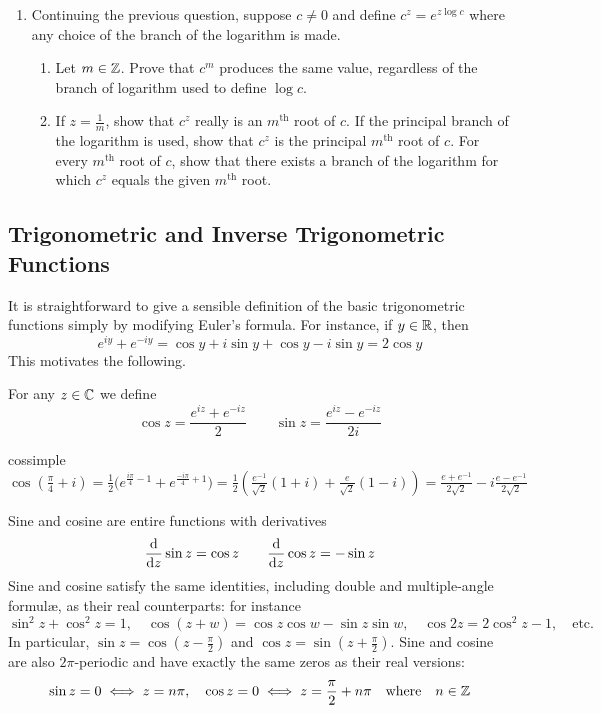 \begin{exercises*}
\begin{enumerate}
  \item Continuing the previous question, suppose $c\neq 0$ and define $c^z=e^{z\log c}$ where any choice of the branch of the logarithm is made.
  \begin{enumerate}
    \item Let $m\in\mathbb{Z}$. Prove that $c^m$ produces the same value, regardless of the branch of logarithm used to define $\log c$.
    \item If $z=\frac 1m$, show that $c^z$ really is an $m^\text{th}$ root of $c$. If the principal branch of the logarithm is used, show that $c^z$ is the principal $m^\text{th}$ root of $c$. For every $m^\text{th}$ root of $c$, show that there exists a branch of the logarithm for which $c^z$ equals the given $m^\text{th}$ root.
  \end{enumerate}
   
\end{enumerate}
\end{exercises*}
\clearpage

\subsection[Trigonometric Functions]{Trigonometric and Inverse Trigonometric Functions}%

It is straightforward to give a sensible definition of the basic trigonometric functions simply by modifying Euler's formula. For instance, if $y\in\mathbb{R}$, then
\[e^{iy}+e^{-iy}=\cos y+i\sin y+\cos y-i\sin y=2\cos y\]
This motivates the following.

\begin{defn}{}{}
For any $z\in\mathbb{C}$ we define
\[\cos z=\frac{e^{iz}+e^{-iz}}2\qquad \sin z=\frac{e^{iz}-e^{-iz}}{2i}\]
\end{defn}

\begin{example}{}{cossimple}
$\cos(\frac\pi 4+i)=\frac 12\bigl(e^{\frac{i\pi}4-1}+e^{\frac{-i\pi}4+1}\bigr)=\frac 12\left(\frac{e^{-1}}{\sqrt 2}(1+i)+\frac{e}{\sqrt 2}(1-i)\right) =\frac{e+e^{-1}}{2\sqrt 2}-i\frac{e-e^{-1}}{2\sqrt 2}$
\end{example}

\begin{thm}{}{}
Sine and cosine are entire functions with derivatives
\[\frac{\mathrm{d} }{\mathrm{d} z}\sin z=\cos z\qquad \frac{\mathrm{d} }{\mathrm{d} z}\cos z=-\sin z\]
Sine and cosine satisfy the same identities, including double and multiple-angle formulæ, as their real counterparts: for instance
\[\sin^2\!z+\cos^2\!z=1,\quad \cos(z+w)=\cos z\cos w-\sin z\sin w,\quad \cos 2z=2\cos^2\!z-1,\quad\text{etc.}\]
In particular, $\sin z=\cos(z-\frac \pi 2)$ and $\cos z=\sin(z+\frac\pi 2)$. Sine and cosine are also $2\pi$-periodic and have exactly the same zeros as their real versions:
\[\sin z=0\iff z=n\pi,\quad \cos z=0\iff z=\frac\pi 2+n\pi\quad\text{where}\quad n\in\mathbb{Z}\]
\end{thm}

